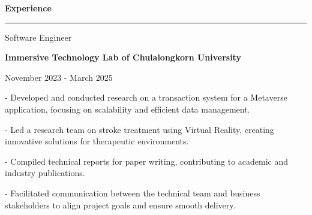 \documentclass[10pt]{article}
\begin{document}
    \noindent
    \begin{minipage}{\textwidth}
        \large\textbf{Experience}\par
        \vspace{0.25em}
        \nointerlineskip
        \noindent
        \rule{0.25\textwidth}{0.4pt}
        \par

        \vspace{0.45em}
        \begin{minipage}{0.595\textwidth}
            \normalsize
            \begingroup
                Software Engineer\par
                \textbf{Immersive Technology Lab of Chulalongkorn University}\par
            \endgroup
        \end{minipage}
        \hfill
        \begin{minipage}{0.255\textwidth}
            \normalsize
            \begingroup
            November 2023 - March 2025
            \endgroup
        \end{minipage}

        \vspace{0.35em}
        \hspace{0.1em}
        \begin{minipage}{0.99\textwidth}
            \normalsize
            \begingroup
            - \hspace{0.5em} Developed and conducted research on a transaction system for a Metaverse application, focusing on scalability and efficient data management.\par
            - \hspace{0.5em} Led a research team on stroke treatment using Virtual Reality, creating innovative solutions for therapeutic environments.\par
            - \hspace{0.5em} Compiled technical reports for paper writing, contributing to academic and industry publications.\par
            - \hspace{0.5em} Facilitated communication between the technical team and business stakeholders to align project goals and ensure smooth delivery.\par
            \endgroup
        \end{minipage}

        \vspace{0.85em}


\end{minipage}
\end{document}
